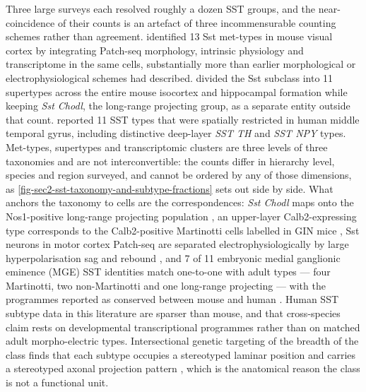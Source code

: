 \documentclass[11pt]{article}
\begin{document}
Three large surveys each resolved roughly a dozen SST groups, and the near-coincidence of their counts is an artefact of three incommensurable counting schemes rather than agreement. \citet{Gouwens2020} identified 13 Sst met-types in mouse visual cortex by integrating Patch-seq morphology, intrinsic physiology and transcriptome in the same cells, substantially more than earlier morphological or electrophysiological schemes had described. \citet{Yao2021} divided the Sst subclass into 11 supertypes across the entire mouse isocortex and hippocampal formation while keeping \emph{Sst Chodl}, the long-range projecting group, as a separate entity outside that count. \citet{Hodge2019} reported 11 SST types that were spatially restricted in human middle temporal gyrus, including distinctive deep-layer \emph{SST TH} and \emph{SST NPY} types. Met-types, supertypes and transcriptomic clusters are three levels of three taxonomies and are not interconvertible: the counts differ in hierarchy level, species and region surveyed, and cannot be ordered by any of those dimensions, as \ref{fig-sec2-sst-taxonomy-and-subtype-fractions} sets out side by side. What anchors the taxonomy to cells are the correspondences: \emph{Sst Chodl} maps onto the Nos1-positive long-range projecting population \citep{Tasic2018}, an upper-layer Calb2-expressing type corresponds to the Calb2-positive Martinotti cells labelled in GIN mice \citep{Tasic2016}, Sst neurons in motor cortex Patch-seq are separated electrophysiologically by large hyperpolarisation sag and rebound \citep{Scala2020}, and 7 of 11 embryonic medial ganglionic eminence (MGE) SST identities match one-to-one with adult types --- four Martinotti, two non-Martinotti and one long-range projecting --- with the programmes reported as conserved between mouse and human \citep{Shi2021}. Human SST subtype data in this literature are sparser than mouse, and that cross-species claim rests on developmental transcriptional programmes rather than on matched adult morpho-electric types. Intersectional genetic targeting of the breadth of the class finds that each subtype occupies a stereotyped laminar position and carries a stereotyped axonal projection pattern \citep{Wu2023}, which is the anatomical reason the class is not a functional unit.
\end{document}
